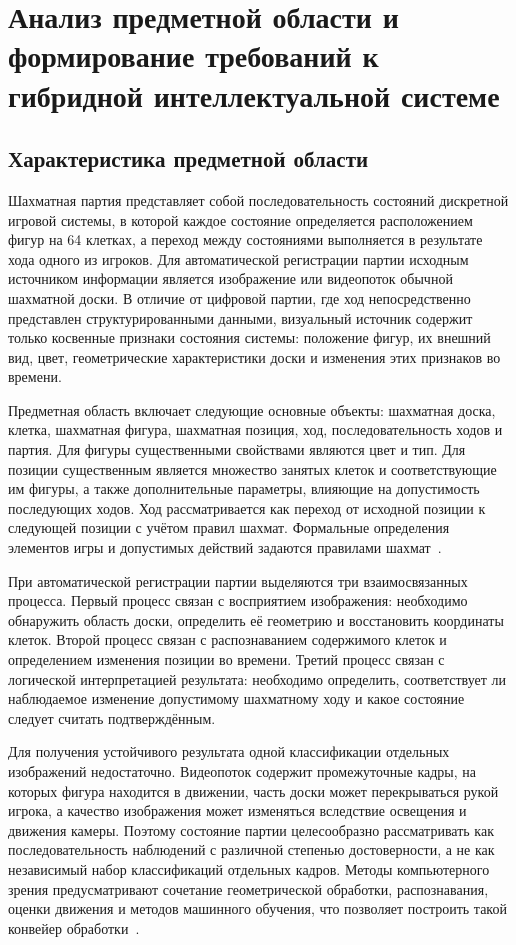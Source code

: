 \section{Анализ предметной области и формирование требований к гибридной интеллектуальной системе}

\subsection{Характеристика предметной области}

Шахматная партия представляет собой последовательность состояний дискретной игровой системы, в которой каждое состояние определяется расположением фигур на 64 клетках, а переход между состояниями выполняется в результате хода одного из игроков. Для автоматической регистрации партии исходным источником информации является изображение или видеопоток обычной шахматной доски. В отличие от цифровой партии, где ход непосредственно представлен структурированными данными, визуальный источник содержит только косвенные признаки состояния системы: положение фигур, их внешний вид, цвет, геометрические характеристики доски и изменения этих признаков во времени.

Предметная область включает следующие основные объекты: шахматная доска, клетка, шахматная фигура, шахматная позиция, ход, последовательность ходов и партия. Для фигуры существенными свойствами являются цвет и тип. Для позиции существенным является множество занятых клеток и соответствующие им фигуры, а также дополнительные параметры, влияющие на допустимость последующих ходов. Ход рассматривается как переход от исходной позиции к следующей позиции с учётом правил шахмат. Формальные определения элементов игры и допустимых действий задаются правилами шахмат~\cite{FIDE2023}.

При автоматической регистрации партии выделяются три взаимосвязанных процесса. Первый процесс связан с восприятием изображения: необходимо обнаружить область доски, определить её геометрию и восстановить координаты клеток. Второй процесс связан с распознаванием содержимого клеток и определением изменения позиции во времени. Третий процесс связан с логической интерпретацией результата: необходимо определить, соответствует ли наблюдаемое изменение допустимому шахматному ходу и какое состояние следует считать подтверждённым.

Для получения устойчивого результата одной классификации отдельных изображений недостаточно. Видеопоток содержит промежуточные кадры, на которых фигура находится в движении, часть доски может перекрываться рукой игрока, а качество изображения может изменяться вследствие освещения и движения камеры. Поэтому состояние партии целесообразно рассматривать как последовательность наблюдений с различной степенью достоверности, а не как независимый набор классификаций отдельных кадров. Методы компьютерного зрения предусматривают сочетание геометрической обработки, распознавания, оценки движения и методов машинного обучения, что позволяет построить такой конвейер обработки~\cite{Szeliski2022,Goodfellow2016}.

